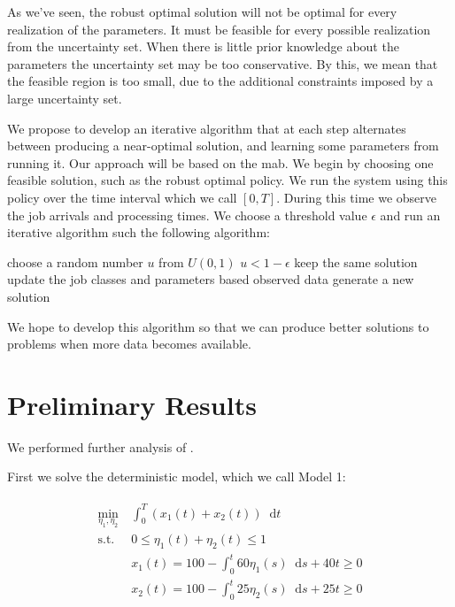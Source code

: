 \documentclass[11pt,a4paper,titlepage]{article}
\newcommand*{\dd}{\ensuremath{\mathop{}\!\mathrm{d}}}%
\theoremstyle{definition}
\theoremstyle{plain}
\begin{document}
As we've seen,
the robust optimal solution will not be optimal for every realization of the parameters.
It must be feasible for every possible realization from the uncertainty set.
When there is little prior knowledge about the parameters
the uncertainty set may be too conservative.
By this,
we mean that the feasible region is too small,
due to the additional constraints imposed by a large uncertainty set.

We propose to develop an iterative algorithm that at each step
alternates between producing a near-optimal solution,
and learning some parameters from running it.
Our approach will be based on the \gls{mab}.
We begin by choosing one feasible solution,
such as the robust optimal policy.
We run the system using this policy over the time interval which we call $[0,T]$.
During this time we observe the job arrivals and processing times.
We choose a threshold value $\epsilon$
and run an iterative algorithm such the following algorithm:

\begin{algorithmic}[0]
    \Loop
        \State choose a random number $u$ from $U(0,1)$
        \If $u < 1 - \epsilon$
            \State keep the same solution
        \Else
            \State update the job classes and parameters based observed data
            \State generate a new solution
        \EndIf
    \EndLoop
\end{algorithmic}

We hope to develop this algorithm so that we can produce better solutions to problems when more data becomes available.


\section{Preliminary Results}
\label{sec:results}

We performed further analysis of .

\newcommand{\modelone}{Model 1}
\newcommand{\modeltwo}{Model 2}

First we solve the deterministic model,
which we call \modelone:

\begin{align}
\label{eq:model-1}
\begin{split}
    \min\limits_{\eta_1, \eta_2}
        &~ \int_0^T \left( x_1(t) + x_2(t) \right) \dd t \\
    \text{s.t.}
        &~ 0 \leq \eta_1(t) + \eta_2(t) \leq 1 \\
        &~ x_1(t) = 100 - \int_0^t 60 \eta_1(s) \dd s + 40t \geq 0 \\
        &~ x_2(t) = 100 - \int_0^t 25 \eta_2(s) \dd s + 25t \geq 0
\end{split}
\end{align}
\end{document}
